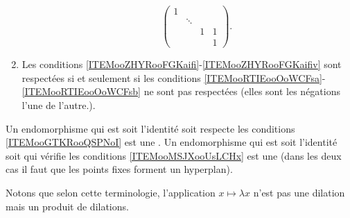 \begin{theoremDef}
\begin{enumerate}
\begin{enumerate}
\begin{equation}
\begin{pmatrix}
                             1   &       &       &       \\
                                &   \ddots    &       &       \\
                                &       &   1    &   1    \\ 
                                &       &       &   1     
                         \end{pmatrix}.
                    \end{equation}
            \end{enumerate}
            \let\theenumii\oldtheenumii
        \item
            Les conditions \ref{ITEMooZHYRooFGKaifi}-\ref{ITEMooZHYRooFGKaifiv} sont respectées si et seulement si les conditions \ref{ITEMooRTIEooOoWCFsa}-\ref{ITEMooRTIEooOoWCFsb} ne sont pas respectées (elles sont les négations l'une de l'autre.).
    \end{enumerate}
    Un endomorphisme qui est soit l'identité soit respecte les conditions \ref{ITEMooGTKRooQSPNoI} est une . Un endomorphisme qui est soit l'identité soit qui vérifie les conditions \ref{ITEMooMSJXooUsLCHx} est une  (dans les deux cas il faut que les points fixes forment un hyperplan).
\end{theoremDef}

Notons que selon cette terminologie, l'application \( x\mapsto \lambda x\) n'est pas une dilation mais un produit de dilations.

